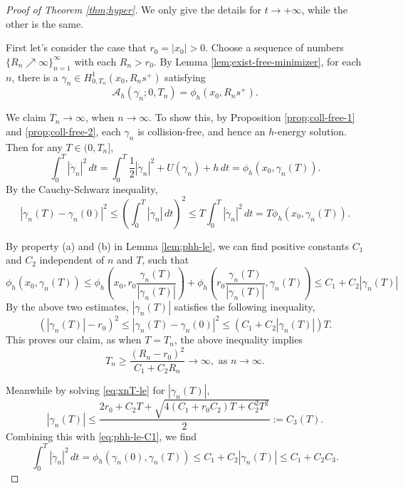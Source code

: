 \documentclass[11pt]{amsart}
\newcommand{\A}{\mathcal A}
\newcommand{\gm}{\gamma}
\newcommand{\ey}{\frac{1}{2}}
\theoremstyle{plain}
\theoremstyle{definition}
\theoremstyle{remark}
\begin{document}
\begin{proof}[Proof of Theorem \ref{thm;hyper}]
We only give the details for $t \to +\infty$, while the other is the same. 

First let's consider the case that $r_0 = |x_0|>0$. Choose a sequence of numbers $\{ R_n \nearrow \infty\}_{n=1}^{\infty}$ with each $R_n > r_0$. By Lemma \ref{lem;exist-free-minimizer}, for each $n$, there is a $\gm_n \in H^1_{0, T_n}(x_0, R_n s^+)$ satisfying 
$$ \A_h(\gm_n;0, T_n) = \phi_h(x_0, R_n s^+). $$ 

We claim $T_n \to \infty$, when $n \to \infty$. To show this, by Proposition \ref{prop;coll-free-1} and \ref{prop;coll-free-2}, each $\gm_n$ is collision-free, and hence an $h$-energy solution. Then for any $T \in (0, T_n]$,  
$$ \int_0^{T} |\dot{\gm}_n|^2 \,dt = \int_{0}^{T} \ey|\dot{\gm}_n|^2 + U(\gm_n)+h \,dt = \phi_h(x_0, \gm_n(T)). $$
By the Cauchy-Schwarz inequality, 
\begin{equation}
\label{eq;xnT-le-phh} |\gm_n(T)-\gm_n(0)|^2 \le \left( \int_0^{T} |\dot{\gm}_n| \,dt \right)^2 \le T \int_{0}^{T} |\dot{\gm}_n|^2 \,dt = T \phi_h(x_0, \gm_n(T)). 
\end{equation}

By property (a) and (b) in Lemma \ref{lem;phh-le}, we can find positive constants $C_1$ and $C_2$ independent of $n$ and $T$, such that  
\begin{equation}
 \label{eq;phh-le-C1} \phi_h(x_0, \gm_n(T)) \le \phi_h \left(x_0, r_0 \frac{\gm_n(T)}{|\gm_n(T)|}\right) + \phi_h \left(r_0 \frac{\gm_n(T)}{|\gm_n(T)|}, \gm_n(T) \right) \le C_1 + C_2 |\gm_n(T)|
 \end{equation} 
By the above two estimates, $|\gm_n(T)|$ satisfies the following inequality, 
\begin{equation}
\label{eq;xnT-le}
 (|\gm_n(T)| - r_0)^2 \le |\gm_n(T) -\gm_n(0)|^2 \le (C_1+ C_2 |\gm_n(T)|)T.
 \end{equation}
This proves our claim, as when $T=T_n$, the above inequality implies
$$ T_n \ge \frac{(R_n - r_0)^2}{C_1 + C_2 R_n} \to \infty, \text{ as } n \to \infty. $$

Meanwhile by solving \eqref{eq;xnT-le} for $|\gm_n(T)|$,  
\begin{equation}
\label{eq;xnT-up-bound} |\gm_n(T)| \le \frac{2r_0 + C_2 T+ \sqrt{4(C_1 + r_0 C_2) T + C_2^2 T^2}}{2}:=C_3(T).
\end{equation}
Combining this with \eqref{eq;phh-le-C1}, we find  
$$ \int_0^T |\dot{\gm}_n|^2 \,dt = \phi_h(\gm_n(0), \gm_n(T)) \le C_1 + C_2|\gm_n(T)| \le C_1 + C_2C_3. $$


\end{proof}
\end{document}
